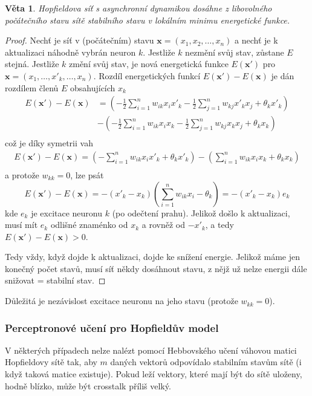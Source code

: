 \documentclass[11pt]{report} %
\renewcommand{\vec}[1]{\mathbf{#1}}
\newtheorem{theorem}{Věta}[section]
\numberwithin{equation}{section}
\begin{document}
\begin{theorem}
Hopfieldova síť s asynchronní dynamikou dosáhne z libovolného počátečního stavu sítě stabilního stavu v lokálním minimu energetické funkce.
\end{theorem}
\begin{proof}
Nechť je síť v (počátečním) stavu $\vec{x} = (x_1,x_2,\dots,x_n)$ a nechť je k aktualizaci náhodně vybrán neuron $k$. Jestliže $k$ nezmění svůj stav, zůstane $E$ stejná. Jestliže $k$ změní svůj stav, je nová energetická funkce $E(\vec{x'})$ pro $\vec{x} = (x_1,\dots,x'_k, \dots,x_n)$. Rozdíl energetických funkcí
$E(\vec{x'}) - E(\vec{x})$ je dán rozdílem členů $E$ obsahujících $x_k$
\begin{align*}
E(\vec{x'}) - E(\vec{x}) &= 
\left(- \frac{1}{2}\sum\limits_{i=1}^{n} w_{ik} x_i x'_k 
- \frac{1}{2}\sum\limits_{j=1}^{n} w_{kj} x'_k x_j 
+ \theta_k x'_k\right)\\
&- \left(- \frac{1}{2}\sum\limits_{i=1}^{n} w_{ik} x_i x_k
- \frac{1}{2}\sum\limits_{j=1}^{n} w_{kj} x_k x_j
+ \theta_k x_k\right)\\
\end{align*}
což je díky symetrii vah
\begin{align*}
E(\vec{x'}) - E(\vec{x}) = 
\left(-\sum\limits_{i=1}^{n} w_{ik} x_i x'_k 
+ \theta_k x'_k\right) 
- \left(\sum\limits_{i=1}^{n} w_{ik} x_i x_k
+ \theta_k x_k\right)\\
\end{align*}
a protože $w_{kk} = 0$, lze psát
$$E(\vec{x'}) - E(\vec{x}) = 
-(x'_k - x_k)\left(\sum\limits_{i=1}^{n} w_{ik} x_i - \theta_k\right) = -(x'_k - x_k)e_k
$$
kde $e_k$ je excitace neuronu $k$ (po odečtení prahu). Jelikož došlo k aktualizaci, musí mít $e_k$ odlišné znaménko od $x_k$ a rovněž od $-x'_k$, a tedy $E(\vec{x'}) - E(\vec{x}) > 0$. 

Tedy vždy, když dojde k aktualizaci, dojde ke snížení energie. Jelikož máme jen konečný počet stavů, musí síť někdy dosáhnout stavu, z nějž už nelze energii dále snižovat = stabilní stav.
\end{proof}

Důležitá je nezávislost excitace neuronu na jeho stavu (protože $w_{kk} = 0$).

\subsubsection{Perceptronové učení pro Hopfieldův model}
V některých případech nelze nalézt pomocí Hebbovského učení váhovou matici Hopfieldovy sítě tak, aby
$m$ daných vektorů odpovídalo stabilním stavům sítě (i když taková matice existuje). Pokud leží vektory, které mají být do sítě uloženy, hodně blízko, může být crosstalk příliš velký. 
\end{document}

